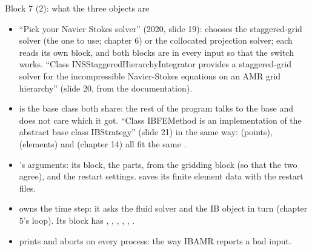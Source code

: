 \documentclass[aspectratio=169,11pt]{beamer}
\begin{document}
\begin{frame}{Block 7 (2): what the three objects are}
\label{fr:solvers2}
\footnotesize
\begin{itemize}
  \item ``Pick your Navier Stokes solver'' (2020, slide 19):  chooses the staggered-grid solver (the one to use; chapter 6) or the collocated projection solver; each reads its own block, and both blocks are in every input so that the switch works. ``Class INSStaggeredHierarchyIntegrator provides a staggered-grid solver for the incompressible Navier-Stokes equations on an AMR grid hierarchy'' (slide 20, from the documentation).
  \item {} is the base class both share: the rest of the program talks to the base and does not care which it got. ``Class IBFEMethod is an implementation of the abstract base class IBStrategy'' (slide 21) in the same way:  (points),  (elements) and  (chapter 14) all fit the same .
  \item {}'s arguments: its block, the parts,  from the gridding block (so that the two agree), and the restart settings.  saves its finite element data with the restart files.
  \item {} owns the time step: it asks the fluid solver and the IB object in turn (chapter 5's loop). Its block has , , , , , .
  \item {} prints and aborts on every process: the way IBAMR reports a bad input.
\end{itemize}
\end{frame}
\end{document}
